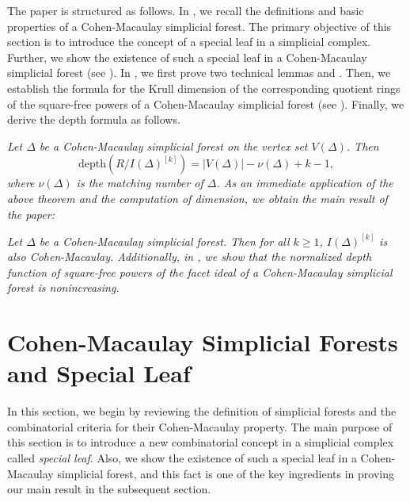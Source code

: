 \documentclass[12pt,a4paper,reqno]{amsart}
\theoremstyle{definition}
\newenvironment{customthm}[1]
  {\renewcommand\theinnercustomthm{#1}\innercustomthm\itshape}
  {\endinnercustomthm}
\newenvironment{customcor}[1]
  {\renewcommand\theinnercustomcor{#1}\innercustomcor\itshape}
  {\endinnercustomcor}
\def\D{\Delta}
\def\d{\mathrm{depth}}
\begin{document}
The paper is structured as follows. In , we recall the definitions and basic properties of a Cohen-Macaulay simplicial forest. The primary objective of this section is to introduce the concept of a special leaf in a simplicial complex. Further, we show the existence of such a special leaf in a Cohen-Macaulay simplicial forest (see ). In , we first prove two technical lemmas  and . Then, we establish the formula for the Krull dimension of the corresponding quotient rings of the square-free powers of a Cohen-Macaulay simplicial forest (see ). Finally, we derive the depth formula as follows.

\begin{customthm}{\ref{main theorem 1}}
    Let $\D$ be a Cohen-Macaulay simplicial forest on the vertex set $V(\D)$. Then 
    \[
    \d(R/I(\D)^{[k]})=|V(\D)|-\nu(\D)+k-1,
    \]
    where $\nu(\D)$ is the matching number of $\D$.
\end{customthm}
\noindent As an immediate application of the above theorem and the computation of dimension, we obtain the main result of the paper:

\begin{customcor}{\ref{main cor}}
        Let $\D$ be a Cohen-Macaulay simplicial forest. Then for all $k\ge 1$, $I(\D)^{[k]}$ is also Cohen-Macaulay.
\end{customcor}
\noindent Additionally, in , we show that the normalized depth function of square-free powers of the facet ideal of a Cohen-Macaulay simplicial forest is nonincreasing.




\section{Cohen-Macaulay Simplicial Forests and Special Leaf}\label{Section 2}

In this section, we begin by reviewing the definition of simplicial forests and the combinatorial criteria for their Cohen-Macaulay property. The main purpose of this section is to introduce a new combinatorial concept in a simplicial complex called \textit{special leaf}. Also, we show the existence of such a special leaf in a Cohen-Macaulay simplicial forest, and this fact is one of the key ingredients in proving our main result in the subsequent section.
\end{document}
